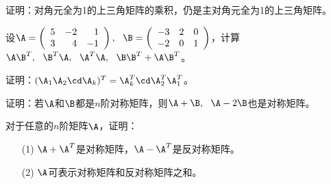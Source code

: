 \begin{frame}
  \begin{footnotesize}
    \begin{exampleblock}{32}
      证明：对角元全为1的上三角矩阵的乘积，仍是主对角元全为1的上三角矩阵。
    \end{exampleblock}
  \end{footnotesize}
\end{frame}


\begin{frame}
  \begin{footnotesize}
    \begin{exampleblock}{33}
      设$\A=\left(
      \begin{array}{rrr}
        5&-2&1\\
        3&4&-1
      \end{array}
      \right),~~\B=\left(
      \begin{array}{rrr}
        -3&2&0\\
        -2&0&1
      \end{array}
      \right)$，计算$\A\B^T,~~\B^T\A,~~\A^T\A,~~\B\B^T+\A\B^T$。
    \end{exampleblock}
  \end{footnotesize}
\end{frame}



\begin{frame}
  \begin{footnotesize}
    \begin{exampleblock}{34}
      证明：$(\A_1\A_2\cd\A_k)^T=\A_k^T\cd\A_2^T\A_1^T$。
    \end{exampleblock}
  \end{footnotesize}
\end{frame}



\begin{frame}
  \begin{footnotesize}
    \begin{exampleblock}{35}
      证明：若$\A$和$\B$都是$n$阶对称矩阵，则$\A+\B,~~\A-2\B$也是对称矩阵。
    \end{exampleblock}
  \end{footnotesize}
\end{frame}



\begin{frame}
  \begin{footnotesize}
    \begin{exampleblock}{36}
      对于任意的$n$阶矩阵$\A$，证明：
      \begin{itemize}
      \item[(1)]$\A+\A^T$是对称矩阵，$\A-\A^T$是反对称矩阵。
      \item[(2)]$\A$可表示对称矩阵和反对称矩阵之和。
      \end{itemize}
    \end{exampleblock}
  \end{footnotesize}
\end{frame}



